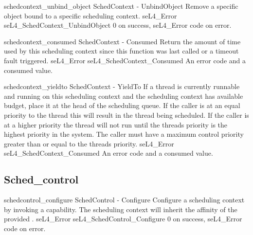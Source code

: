 \pagebreak
\apidoc
{schedcontext_unbind_object}
{SchedContext - UnbindObject}
{ Remove a specific object bound to a specific scheduling context.}
{seL4\_Error seL4\_SchedContext\_UnbindObject}
{
}
{0 on success, seL4\_Error code on error.}

\apidoc
{schedcontext_consumed}
{SchedContext - Consumed}
{ Return the amount of time used by this scheduling context since this function
    was last called or a timeout fault triggered.}
{seL4\_Error seL4\_SchedContext\_Consumed}
{
}
{An error code and a  consumed value.}

\apidoc
{schedcontext_yieldto}
{SchedContext - YieldTo}
{ 
   If a thread is currently runnable and running on this scheduling context and the scheduling context has available budget, place it at the head of the scheduling queue.
              If the caller is at an equal priority to the thread this will result in the thread being scheduled.
              If the caller is at a higher priority the thread will not run until the threads priority is the highest priority in the system.
              The caller must have a maximum control priority greater than or equal to the threads priority.
}
{seL4\_Error seL4\_SchedContext\_Consumed}
{
}
{An error code and a  consumed value.}



\subsection{Sched\_control}
\apidoc
{schedcontrol_configure}
{SchedControl - Configure}
{ Configure a scheduling context by invoking a  capability. The scheduling
context will inherit the affinity of the provided .}
{seL4\_Error seL4\_SchedControl\_Configure}
{
}
{0 on success, seL4\_Error code on error.}

